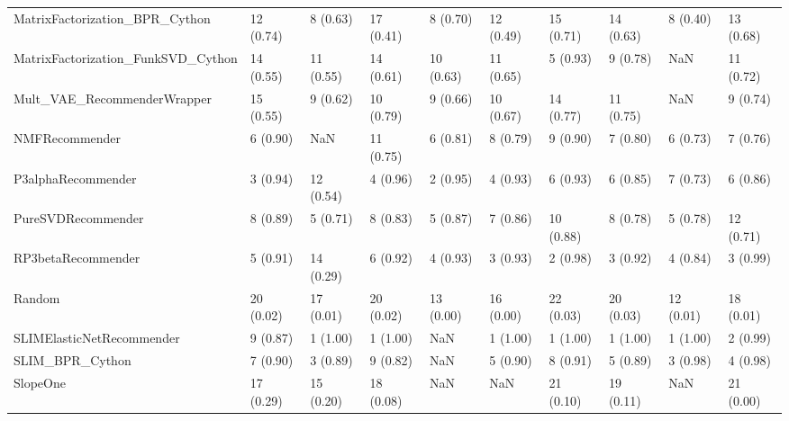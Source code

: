 \begin{tabular}{llllllllll}
     MatrixFactorization\_BPR\_Cython &                12 (0.74) &    8 (0.63) &     17 (0.41) &     8 (0.70) &            12 (0.49) &           15 (0.71) &         14 (0.63) &           8 (0.40) &         13 (0.68) \\
 MatrixFactorization\_FunkSVD\_Cython &                14 (0.55) &   11 (0.55) &     14 (0.61) &    10 (0.63) &            11 (0.65) &            5 (0.93) &          9 (0.78) &                NaN &         11 (0.72) \\
        Mult\_VAE\_RecommenderWrapper &                15 (0.55) &    9 (0.62) &     10 (0.79) &     9 (0.66) &            10 (0.67) &           14 (0.77) &         11 (0.75) &                NaN &          9 (0.74) \\
                     NMFRecommender &                 6 (0.90) &         NaN &     11 (0.75) &     6 (0.81) &             8 (0.79) &            9 (0.90) &          7 (0.80) &           6 (0.73) &          7 (0.76) \\
                 P3alphaRecommender &                 3 (0.94) &   12 (0.54) &      4 (0.96) &     2 (0.95) &             4 (0.93) &            6 (0.93) &          6 (0.85) &           7 (0.73) &          6 (0.86) \\
                 PureSVDRecommender &                 8 (0.89) &    5 (0.71) &      8 (0.83) &     5 (0.87) &             7 (0.86) &           10 (0.88) &          8 (0.78) &           5 (0.78) &         12 (0.71) \\
                 RP3betaRecommender &                 5 (0.91) &   14 (0.29) &      6 (0.92) &     4 (0.93) &             3 (0.93) &            2 (0.98) &          3 (0.92) &           4 (0.84) &          3 (0.99) \\
                             Random &                20 (0.02) &   17 (0.01) &     20 (0.02) &    13 (0.00) &            16 (0.00) &           22 (0.03) &         20 (0.03) &          12 (0.01) &         18 (0.01) \\
          SLIMElasticNetRecommender &                 9 (0.87) &    1 (1.00) &      1 (1.00) &          NaN &             1 (1.00) &            1 (1.00) &          1 (1.00) &           1 (1.00) &          2 (0.99) \\
                    SLIM\_BPR\_Cython &                 7 (0.90) &    3 (0.89) &      9 (0.82) &          NaN &             5 (0.90) &            8 (0.91) &          5 (0.89) &           3 (0.98) &          4 (0.98) \\
                           SlopeOne &                17 (0.29) &   15 (0.20) &     18 (0.08) &          NaN &                  NaN &           21 (0.10) &         19 (0.11) &                NaN &         21 (0.00) \\

\end{tabular}
